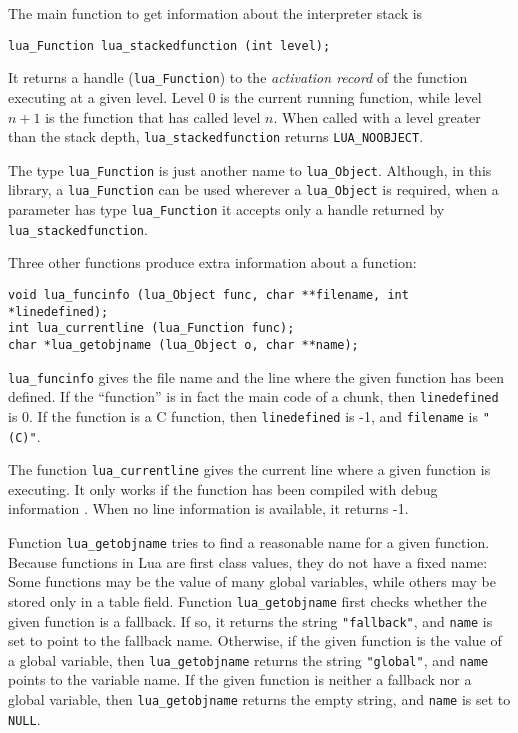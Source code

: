 The main function to get information about the interpreter stack
is
\begin{verbatim}
lua_Function lua_stackedfunction (int level);
\end{verbatim}
It returns a handle (\verb'lua_Function') to the {\em activation record\/}
of the function executing at a given level.
Level 0 is the current running function,
while level $n+1$ is the function that has called level $n$.
When called with a level greater than the stack depth,
\verb'lua_stackedfunction' returns \verb'LUA_NOOBJECT'.

The type \verb'lua_Function' is just another name
to \verb'lua_Object'.
Although, in this library,
a \verb'lua_Function' can be used wherever a \verb'lua_Object' is required,
when a parameter has type \verb'lua_Function'
it accepts only a handle returned by
\verb'lua_stackedfunction'.

Three other functions produce extra information about a function:
\begin{verbatim}
void lua_funcinfo (lua_Object func, char **filename, int *linedefined);
int lua_currentline (lua_Function func);
char *lua_getobjname (lua_Object o, char **name);
\end{verbatim}
\verb'lua_funcinfo' gives the file name and the line where the
given function has been defined.
If the ``function'' is in fact the main code of a chunk,
then \verb'linedefined' is 0.
If the function is a C function,
then \verb'linedefined' is -1, and \verb'filename' is \verb'"(C)"'.

The function \verb'lua_currentline' gives the current line where
a given function is executing.
It only works if the function has been compiled with debug
information .
When no line information is available, it returns -1.

Function \verb'lua_getobjname' tries to find a reasonable name for
a given function.
Because functions in Lua are first class values,
they do not have a fixed name:
Some functions may be the value of many global variables,
while others may be stored only in a table field.
Function \verb'lua_getobjname' first checks whether the given
function is a fallback.
If so, it returns the string \verb'"fallback"',
and \verb'name' is set to point to the fallback name.
Otherwise, if the given function is the value of a global variable,
then \verb'lua_getobjname' returns the string \verb'"global"',
and \verb'name' points to the variable name.
If the given function is neither a fallback nor a global variable,
then \verb'lua_getobjname' returns the empty string,
and \verb'name' is set to \verb'NULL'.

